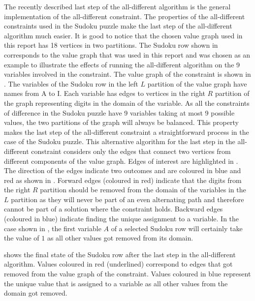 \documentclass{l4proj}
\begin{document}
\noindent The recently described last step of the all-different algorithm is the general implementation of the all-different constraint. The properties of the all-different constraints used in the Sudoku puzzle make the last step of the all-different algorithm much easier. It is good to notice that the chosen value graph used in this report has 18 vertices in two partitions. The Sudoku row shown in  corresponds to the value graph that was used in this report and was chosen as an example to illustrate the effects of running the all-different algorithm on the 9 variables involved in the constraint. The value graph of the constraint is shown in . The variables of the Sudoku row in the left $L$ partition of the value graph have names from A to I. Each variable has edges to vertices in the right $R$ partition of the graph representing digits in the domain of the variable. As all the constraints of difference in the Sudoku puzzle have 9 variables taking at most 9 possible values, the two partitions of the graph will always be balanced. This property makes the last step of the all-different constraint a straightforward process in the case of the Sudoku puzzle. This alternative algorithm for the last step in the all-different constraint considers only the edges that connect two vertices from different components of the value graph. Edges of interest are highlighted in . The direction of the edges indicate two outcomes and are coloured in blue and red as shown in . Forward edges (coloured in red) indicate that the digits from the right $R$ partition should be removed from the domain of the variables in the $L$ partition as they will never be part of an even alternating path and therefore cannot be part of a solution where the constraint holds. Backward edges (coloured in blue) indicate finding the unique assignment to a variable. In the case shown in , the first variable $A$ of a selected Sudoku row will certainly take the value of $1$ as all other values got removed from its domain.

\noindent {} shows the final state of the Sudoku row after the last step in the all-different algorithm. Values coloured in red (underlined) correspond to edges that got removed from the value graph of the constraint. Values coloured in blue represent the unique value that is assigned to a variable as all other values from the domain got removed.
\end{document}
